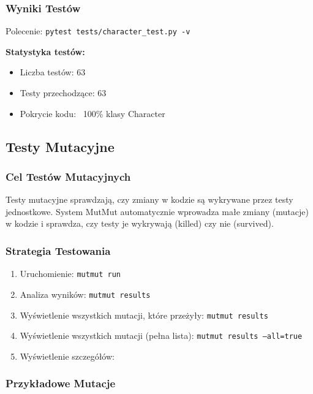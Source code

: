 \documentclass[12pt,a4paper]{article}
\begin{document}
\subsubsection{Wyniki Testów}

Polecenie: \texttt{pytest tests/character\_test.py -v}

\textbf{Statystyka testów:}
\begin{itemize}
	\item Liczba testów: 63
	\item Testy przechodzące: 63
	\item Pokrycie kodu: ~100\% klasy Character
\end{itemize}

\subsection{Testy Mutacyjne}

\subsubsection{Cel Testów Mutacyjnych}

Testy mutacyjne sprawdzają, czy zmiany w kodzie są wykrywane przez testy
jednostkowe. System MutMut automatycznie wprowadza małe zmiany (mutacje) w
kodzie i sprawdza, czy testy je wykrywają (killed) czy nie (survived).

\subsubsection{Strategia Testowania}

\begin{enumerate}
	\item Uruchomienie: \texttt{mutmut run}
	\item Analiza wyników: \texttt{mutmut results}
	\item Wyświetlenie wszystkich mutacji, które przeżyły: \texttt{mutmut results}
	\item Wyświetlenie wszystkich mutacji (pełna lista): \texttt{mutmut results
		      --all=true}
	\item Wyświetlenie szczegółów: \texttt{}
\end{enumerate}

\subsubsection{Przykładowe Mutacje}
\end{document}
